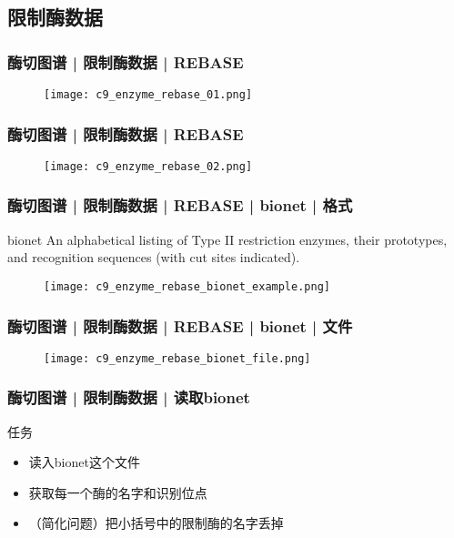 \subsection{限制酶数据}
\begin{frame}
  \frametitle{酶切图谱 | 限制酶数据 | REBASE}
  \begin{figure}
    \centering
    \texttt{[image: c9\_enzyme\_rebase\_01.png]}
  \end{figure}
\end{frame}

\begin{frame}
  \frametitle{酶切图谱 | 限制酶数据 | REBASE}
  \begin{figure}
    \centering
    \texttt{[image: c9\_enzyme\_rebase\_02.png]}
  \end{figure}
\end{frame}

\begin{frame}
  \frametitle{酶切图谱 | 限制酶数据 | REBASE | bionet | 格式}
  \begin{block}{bionet}
    An alphabetical listing of Type II restriction enzymes, their prototypes, and recognition sequences (with cut sites indicated). 
  \end{block}
  \begin{figure}
    \centering
    \texttt{[image: c9\_enzyme\_rebase\_bionet\_example.png]}
  \end{figure}
\end{frame}

\begin{frame}
  \frametitle{酶切图谱 | 限制酶数据 | REBASE | bionet | 文件}
  \begin{figure}
    \centering
    \texttt{[image: c9\_enzyme\_rebase\_bionet\_file.png]}
  \end{figure}
\end{frame}

\begin{frame}
  \frametitle{酶切图谱 | 限制酶数据 | 读取bionet}
  \begin{block}{任务}
    \begin{itemize}
      \item 读入bionet这个文件
      \item 获取每一个酶的名字和识别位点
      \item （简化问题）把小括号中的限制酶的名字丢掉
    \end{itemize}
  \end{block}
\end{frame}

